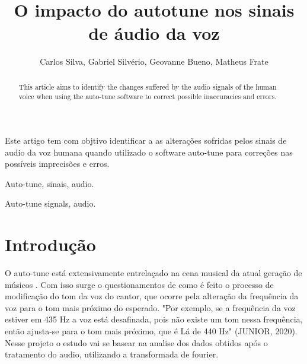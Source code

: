 \documentclass{sbrt}
\begin{document}
\title{O impacto do autotune nos sinais de áudio da voz}

\author{Carlos Silva, Gabriel Silvério, Geovanne Bueno, Matheus Frate}


\maketitle



\begin{resumo}
Este artigo tem com objtivo identificar a as alterações sofridas pelos sinais de audio da voz humana quando utilizado o software auto-tune para correções nas possíveis imprecisões e erros.
\end{resumo}
\begin{chave}
Auto-tune, sinais, audio.
\end{chave}


\begin{abstract}
This article aims to identify the changes suffered by the audio signals of the human voice when using the auto-tune software to correct possible inaccuracies and errors.

\end{abstract}
\begin{keywords}
Auto-tune signals, audio.
\end{keywords}


\section{Introdução}

O auto-tune está extensivamente entrelaçado na cena musical da atual geração de músicos \cite{ref1}. Com isso surge o questionamentos de como é feito o processo de modificação do tom da voz do cantor, que ocorre pela alteração da frequência da voz para o tom mais próximo do esperado. 
"Por exemplo, se a frequência da voz estiver em 435 Hz a voz está desafinada, pois não existe um tom nessa frequência, então ajusta-se para o tom mais próximo, que é Lá de 440 Hz" (JUNIOR, 2020). Nesse projeto o estudo vai se basear na analise dos dados obtidos após o tratamento do audio, utilizando a transformada de fourier.
\end{document}
